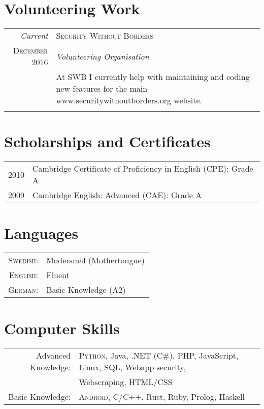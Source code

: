 \documentclass[a4paper,10pt]{article}
\begin{document}
\section{Volunteering Work}
\begin{tabular}{r|p{11cm}}
 \emph{Current} & \textsc{Security Without Borders} \\
 \textsc{December 2016}&\emph{Volunteering Organisation}\\
 &\footnotesize{At SWB I currently help with maintaining and coding new features for the main www.securitywithoutborders.org website.} \\ \multicolumn{2}{c}{} \\
 
\end{tabular}

\section{Scholarships and Certificates}
\begin{tabular}{rl}
 \textsc{2010} & Cambridge Certificate of Proficiency in English (CPE): Grade A \\
\textsc{2009} & Cambridge English: Advanced (CAE): Grade A
\end{tabular}

\section{Languages}
\begin{tabular}{rl}
\textsc{Swedish:}& Modersmål (Mothertongue)\\
\textsc{English:}& Fluent\\
\textsc{German:}& Basic Knowledge (A2)\\
\end{tabular}

\section{Computer Skills}
\begin{tabular}{rl}
 Advanced Knowledge:& \textsc{Python}, Java, .NET (C\#), PHP, JavaScript, Linux, SQL, Webapp security,\\& Webscraping, HTML/CSS\\
 Basic Knowledge:&  \textsc{Android}, C/C++, Rust, Ruby, Prolog, Haskell  \\
\end{tabular}
\end{document}

